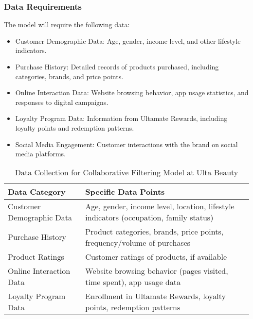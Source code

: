 \documentclass{article}
\begin{document}
\subsubsection{Data Requirements}
\label{sec:data_requirements}
The model will require the following data:
\begin{itemize}
    \item Customer Demographic Data: Age, gender, income level, and other lifestyle indicators.
    \item Purchase History: Detailed records of products purchased, including categories, brands, and price points.
    \item Online Interaction Data: Website browsing behavior, app usage statistics, and responses to digital campaigns.
    \item Loyalty Program Data: Information from Ultamate Rewards, including loyalty points and redemption patterns.
    \item Social Media Engagement: Customer interactions with the brand on social media platforms.
\end{itemize}

\begin{table}[H]
\centering
\begin{tabular}{|l|p{10cm}|}
\hline
\textbf{Data Category} & \textbf{Specific Data Points} \\
\hline
Customer Demographic Data & Age, gender, income level, location, lifestyle indicators (occupation, family status) \\
\hline
Purchase History & Product categories, brands, price points, frequency/volume of purchases \\
\hline
Product Ratings & Customer ratings of products, if available \\
\hline
Online Interaction Data & Website browsing behavior (pages visited, time spent), app usage data \\
\hline
Loyalty Program Data & Enrollment in Ultamate Rewards, loyalty points, redemption patterns \\
\hline
\end{tabular}
\caption{Data Collection for Collaborative Filtering Model at Ulta Beauty}
\label{table:data_collection_cf}
\end{table}
\end{document}
